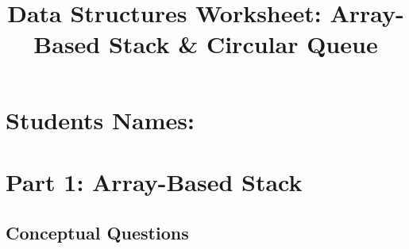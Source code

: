 \documentclass[12pt]{article}
\title{\textbf{Data Structures Worksheet: Array-Based Stack \& Circular Queue}}
\author{}
\date{}
\begin{document}
\maketitle

\section*{Students Names: \underline{\hspace{8cm}}}

\section*{Part 1: Array-Based Stack}

\subsection*{Conceptual Questions}
\end{document}
